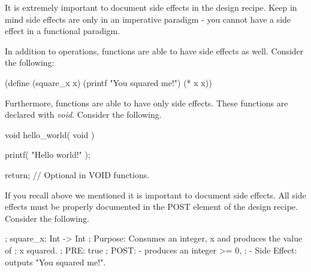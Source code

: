 
It is extremely important to document side effects in the design recipe. Keep in mind side effects are only in an imperative paradigm - you cannot have a side effect in a functional paradigm.\\

\clearpage
{}

In addition to operations, functions are able to have side effects as well. Consider the following:\\


\begin{code}[Lisp]
(define (square_x x)
	(printf "You squared me!")
	(* x x))
\end{code}

Furthermore, functions are able to have only side effects. These functions are declared with \emph{void}. Consider the following.\\


\begin{code}[c]
void hello_world( void ) {
	printf( "Hello world!\n" );
	
	return; // Optional in VOID functions.
}
\end{code}

If you recall above we mentioned it is important to document side effects. All side effects must be properly documented in the POST element of the design recipe. Consider the following.\\


\clearpage
\begin{code}[Lisp]
; square_x: Int -> Int
;	Purpose: Consumes an integer, x and produces the value of
;            x squared.
; PRE: true
; POST: - produces an integer >= 0,
;       - Side Effect: outputs "You squared me!".
\end{code}

